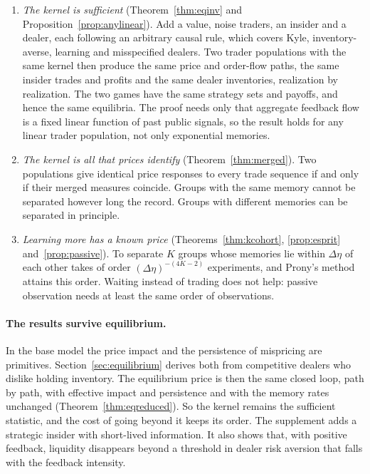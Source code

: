 \documentclass[12pt]{article}
\theoremstyle{definition}
\theoremstyle{remark}
\begin{document}
\begin{enumerate}[label=(\arabic*),leftmargin=*,itemsep=2pt]
\item \emph{The kernel is sufficient} (Theorem~\ref{thm:eqinv} and Proposition~\ref{prop:anylinear}). Add a value, noise traders, an insider and a dealer, each following an arbitrary causal rule, which covers Kyle, inventory-averse, learning and misspecified dealers. Two trader populations with the same kernel then produce the same price and order-flow paths, the same insider trades and profits and the same dealer inventories, realization by realization. The two games have the same strategy sets and payoffs, and hence the same equilibria. The proof needs only that aggregate feedback flow is a fixed linear function of past public signals, so the result holds for any linear trader population, not only exponential memories.
\item \emph{The kernel is all that prices identify} (Theorem~\ref{thm:merged}). Two populations give identical price responses to every trade sequence if and only if their merged measures coincide. Groups with the same memory cannot be separated however long the record. Groups with different memories can be separated in principle.
\item \emph{Learning more has a known price} (Theorems~\ref{thm:kcohort}, \ref{prop:esprit} and~\ref{prop:passive}). To separate $K$ groups whose memories lie within $\Delta\eta$ of each other takes of order $(\Delta\eta)^{-(4K-2)}$ experiments, and Prony's method attains this order. Waiting instead of trading does not help: passive observation needs at least the same order of observations.
\end{enumerate}

\paragraph{The results survive equilibrium.} In the base model the price impact and the persistence of mispricing are primitives. Section~\ref{sec:equilibrium} derives both from competitive dealers who dislike holding inventory. The equilibrium price is then the same closed loop, path by path, with effective impact and persistence and with the memory rates unchanged (Theorem~\ref{thm:eqreduced}). So the kernel remains the sufficient statistic, and the cost of going beyond it keeps its order. The supplement adds a strategic insider with short-lived information. It also shows that, with positive feedback, liquidity disappears beyond a threshold in dealer risk aversion that falls with the feedback intensity.
\end{document}

